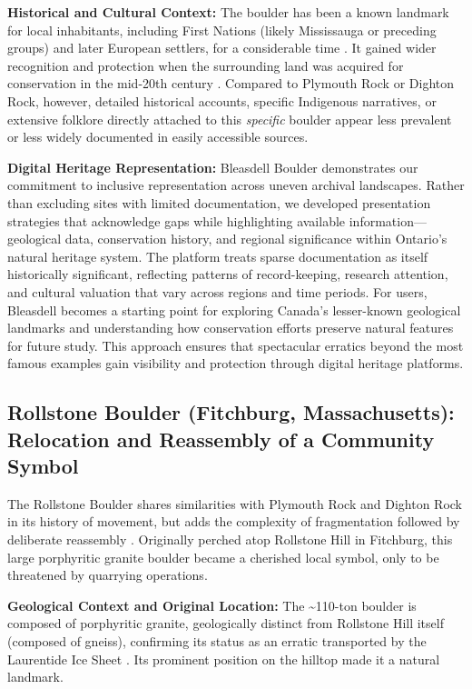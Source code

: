 \textbf{Historical and Cultural Context:} The boulder has been a known landmark for local inhabitants, including First Nations (likely Mississauga or preceding groups) and later European settlers, for a considerable time \cite{Chapman1984}. It gained wider recognition and protection when the surrounding land was acquired for conservation in the mid-20th century \cite{LTCBleasdell}. Compared to Plymouth Rock or Dighton Rock, however, detailed historical accounts, specific Indigenous narratives, or extensive folklore directly attached to this \emph{specific} boulder appear less prevalent or less widely documented in easily accessible sources.

\textbf{Digital Heritage Representation:} Bleasdell Boulder demonstrates our commitment to inclusive representation across uneven archival landscapes. Rather than excluding sites with limited documentation, we developed presentation strategies that acknowledge gaps while highlighting available information—geological data, conservation history, and regional significance within Ontario's natural heritage system. The platform treats sparse documentation as itself historically significant, reflecting patterns of record-keeping, research attention, and cultural valuation that vary across regions and time periods. For users, Bleasdell becomes a starting point for exploring Canada's lesser-known geological landmarks and understanding how conservation efforts preserve natural features for future study. This approach ensures that spectacular erratics beyond the most famous examples gain visibility and protection through digital heritage platforms.

\subsection{Rollstone Boulder (Fitchburg, Massachusetts): Relocation and Reassembly of a Community Symbol}
\label{subsec:rollstone}

The Rollstone Boulder shares similarities with Plymouth Rock and Dighton Rock in its history of movement, but adds the complexity of fragmentation followed by deliberate reassembly \cite{googleLewistonEvening, telegramWorcesterCounty}. Originally perched atop Rollstone Hill in Fitchburg, this large porphyritic granite boulder became a cherished local symbol, only to be threatened by quarrying operations.

\textbf{Geological Context and Original Location:} The \textasciitilde110-ton boulder is composed of porphyritic granite, geologically distinct from Rollstone Hill itself (composed of gneiss), confirming its status as an erratic transported by the Laurentide Ice Sheet \cite{mindatMineralsRollstone, Hitchcock1841}. Its prominent position on the hilltop made it a natural landmark.

